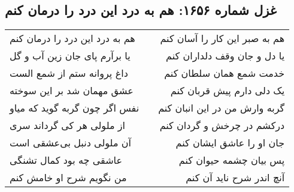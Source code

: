\begin{center}
\section*{غزل شماره ۱۶۵۶: هم به درد این درد را درمان کنم}
\label{sec:1656}
\begin{longtable}{l p{0.5cm} r}
هم به درد این درد را درمان کنم
&&
هم به صبر این کار را آسان کنم
\\
یا برآرم پای جان زین آب و گل
&&
یا دل و جان وقف دلداران کنم
\\
داغ پروانه ستم از شمع الست
&&
خدمت شمع همان سلطان کنم
\\
عشق مهمان شد بر این سوخته
&&
یک دلی دارم پیش قربان کنم
\\
نفس اگر چون گربه گوید که میاو
&&
گربه وارش من در این انبان کنم
\\
از ملولی هر کی گرداند سری
&&
درکشم در چرخش و گردان کنم
\\
آن ملولی دنبل بی‌عشقی است
&&
جان او را عاشق ایشان کنم
\\
عاشقی چه بود کمال تشنگی
&&
پس بیان چشمه حیوان کنم
\\
من نگویم شرح او خامش کنم
&&
آنچ اندر شرح ناید آن کنم
\\
\end{longtable}
\end{center}
